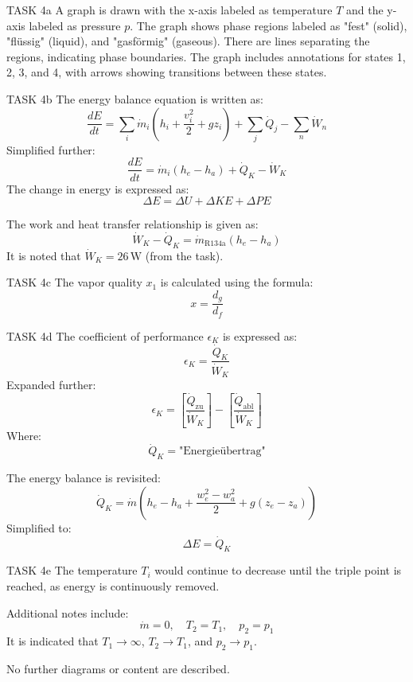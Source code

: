 TASK 4a  
A graph is drawn with the x-axis labeled as temperature \( T \) and the y-axis labeled as pressure \( p \). The graph shows phase regions labeled as "fest" (solid), "flüssig" (liquid), and "gasförmig" (gaseous). There are lines separating the regions, indicating phase boundaries. The graph includes annotations for states 1, 2, 3, and 4, with arrows showing transitions between these states.  

TASK 4b  
The energy balance equation is written as:  
\[
\frac{dE}{dt} = \sum_i \dot{m}_i \left( h_i + \frac{v_i^2}{2} + g z_i \right) + \sum_j \dot{Q}_j - \sum_n \dot{W}_n
\]  
Simplified further:  
\[
\frac{dE}{dt} = \dot{m}_i \left( h_e - h_a \right) + \dot{Q}_K - \dot{W}_K
\]  
The change in energy is expressed as:  
\[
\Delta E = \Delta U + \Delta KE + \Delta PE
\]  

The work and heat transfer relationship is given as:  
\[
\dot{W}_K - \dot{Q}_K = \dot{m}_{\text{R134a}} \left( h_e - h_a \right)
\]  
It is noted that \( \dot{W}_K = 26 \, \text{W} \) (from the task).  

TASK 4c  
The vapor quality \( x_1 \) is calculated using the formula:  
\[
x = \frac{d_g}{d_f}
\]  

TASK 4d  
The coefficient of performance \( \epsilon_K \) is expressed as:  
\[
\epsilon_K = \frac{\dot{Q}_K}{\dot{W}_K}
\]  
Expanded further:  
\[
\epsilon_K = \left[ \frac{\dot{Q}_{\text{zu}}}{\dot{W}_K} \right] - \left[ \frac{\dot{Q}_{\text{abl}}}{\dot{W}_K} \right]
\]  
Where:  
\[
\dot{Q}_K = \text{"Energieübertrag"}
\]  

The energy balance is revisited:  
\[
\dot{Q}_K = \dot{m} \left( h_e - h_a + \frac{w_e^2 - w_a^2}{2} + g \left( z_e - z_a \right) \right)
\]  
Simplified to:  
\[
\Delta E = \dot{Q}_K
\]  

TASK 4e  
The temperature \( T_i \) would continue to decrease until the triple point is reached, as energy is continuously removed.  

Additional notes include:  
\[
\dot{m} = 0, \quad T_2 = T_1, \quad p_2 = p_1
\]  
It is indicated that \( T_1 \to \infty \), \( T_2 \to T_1 \), and \( p_2 \to p_1 \).  

No further diagrams or content are described.